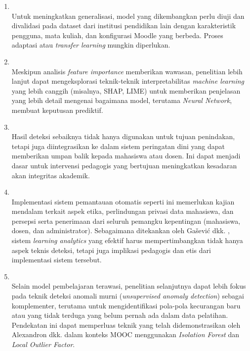 \begin{enumerate}
    \item {} \\
    Untuk meningkatkan generalisasi, model yang dikembangkan perlu diuji dan divalidasi pada dataset dari institusi pendidikan lain dengan karakteristik pengguna, mata kuliah, dan konfigurasi Moodle yang berbeda. Proses adaptasi atau \textit{transfer learning} mungkin diperlukan.

    \item {} \\
    Meskipun analisis \textit{feature importance} memberikan wawasan, penelitian lebih lanjut dapat mengeksplorasi teknik-teknik interpretabilitas \textit{machine learning} yang lebih canggih (misalnya, SHAP, LIME) untuk memberikan penjelasan yang lebih detail mengenai bagaimana model, terutama \textit{Neural Network}, membuat keputusan prediktif.

    \item {} \\
    Hasil deteksi sebaiknya tidak hanya digunakan untuk tujuan penindakan, tetapi juga diintegrasikan ke dalam sistem peringatan dini yang dapat memberikan umpan balik kepada mahasiswa atau dosen. Ini dapat menjadi dasar untuk intervensi pedagogis yang bertujuan meningkatkan kesadaran akan integritas akademik.

    \item {} \\
    Implementasi sistem pemantauan otomatis seperti ini memerlukan kajian mendalam terkait aspek etika, perlindungan privasi data mahasiswa, dan persepsi serta penerimaan dari seluruh pemangku kepentingan (mahasiswa, dosen, dan administrator). Sebagaimana ditekankan oleh Ga\v{s}evi\'{c} dkk. \cite{Gasevic2015}, sistem \textit{learning analytics} yang efektif harus mempertimbangkan tidak hanya aspek teknis deteksi, tetapi juga implikasi pedagogis dan etis dari implementasi sistem tersebut.

    \item {} \\
    Selain model pembelajaran terawasi, penelitian selanjutnya dapat lebih fokus pada teknik deteksi anomali murni (\textit{unsupervised anomaly detection}) sebagai komplementer, terutama untuk mengidentifikasi pola-pola kecurangan baru atau yang tidak terduga yang belum pernah ada dalam data pelatihan. Pendekatan ini dapat memperluas teknik yang telah didemonstrasikan oleh Alexandron dkk. \cite{Alexandron2019} dalam konteks MOOC menggunakan \textit{Isolation Forest} dan \textit{Local Outlier Factor}.
\end{enumerate}

